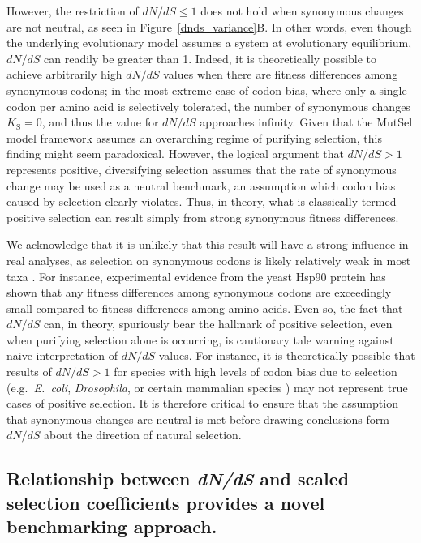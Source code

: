 \documentclass[11pt]{article}
\begin{document}
However, the restriction of $dN/dS \leq 1$ does not hold when synonymous changes are not neutral, as seen in Figure~\ref{dnds_variance}B. In other words, even though the underlying evolutionary model assumes a system at evolutionary equilibrium, $dN/dS$ can readily be greater than 1. Indeed, it is theoretically possible to achieve arbitrarily high $dN/dS$ values when there are fitness differences among synonymous codons; in the most extreme case of codon bias, where only a single codon per amino acid is selectively tolerated, the number of synonymous changes $K_\text{S} = 0$, and thus the value for $dN/dS$ approaches infinity. Given that the MutSel model framework assumes an overarching regime of purifying selection, this finding might seem paradoxical. However, the logical argument that $dN/dS > 1$ represents positive, diversifying selection assumes that the rate of synonymous change may be used as a neutral benchmark, an assumption which codon bias caused by selection clearly violates. Thus, in theory, what is classically termed positive selection can result simply from strong synonymous fitness differences. 	
		
We acknowledge that it is unlikely that this result will have a strong influence in real analyses, as selection on synonymous codons is likely relatively weak in most taxa \cite{HershbergPetrov2008}. For instance, experimental evidence from the yeast Hsp90 protein has shown that any fitness differences among synonymous codons are exceedingly small compared to fitness differences among amino acids.  Even so, the fact that $dN/dS$ can, in theory, spuriously bear the hallmark of positive selection, even when purifying selection alone is occurring, is cautionary tale warning against naive interpretation of $dN/dS$ values. For instance, it is theoretically possible that results of $dN/dS > 1$ for species with high levels of codon bias due to selection (e.g.\ \emph{E.\ coli}, \emph{Drosophila}, or certain mammalian species \cite{Duret2002, Chamaryetal2006, PlotkinKudla2010}) may not represent true cases of positive selection. It is therefore critical to ensure that the assumption that synonymous changes are neutral is met before drawing conclusions form $dN/dS$ about the direction of natural selection.

\subsection*{Relationship between \emph{dN/dS} and scaled selection coefficients provides a novel benchmarking approach.}
\end{document}
